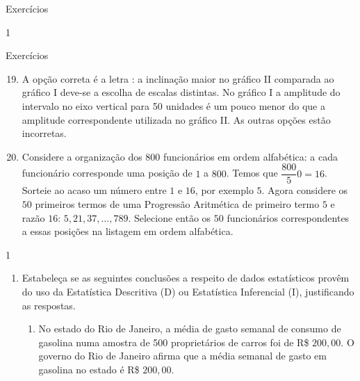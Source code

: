 {\begin{answer}{Exercícios}
{\begin{enumerate}
\begin{figure}[H]
  \end{figure}
  \end{enumerate}
}{1}
\end{answer}
\clearmargin
\begin{answer}{Exercícios}
{\exerciselist
  \begin{enumerate} \setcounter{enumi}{18}
  \item A opção correta é a letra : a inclinação maior no gráfico II comparada ao gráfico I deve-se a escolha de escalas distintas. No gráfico I a amplitude do intervalo no eixo vertical para 50 unidades é um pouco menor do que a amplitude correspondente utilizada no gráfico II. As outras opções estão incorretas.

  \item Considere a organização dos $800$ funcionários em ordem alfabética: a cada funcionário corresponde uma posição de $1$ a $800$. Temos que $\dfrac{800}50=16$. Sorteie ao acaso um número entre $1$ e $16$, por exemplo $5$. Agora considere os $50$ primeiros termos de uma Progressão Aritmética de primeiro termo $5$ e razão $16$: $5, 21, 37,..., 789$. Selecione então os $50$ funcionários correspondentes a essas posições na listagem em ordem alfabética.
  \end{enumerate}
}{1}
\end{answer}


\label{\detokenize{PE103-E:exercicios}}\label{\detokenize{PE103-E::doc}}
\begin{enumerate}
\item Estabeleça se as seguintes conclusões a respeito de dados estatísticos provêm do uso da Estatística Descritiva (D) ou Estatística Inferencial (I), justificando as respostas.
\begin{enumerate}
\item {} 
No estado do Rio de Janeiro, a média de gasto semanal de consumo de gasolina numa amostra de 500 proprietários de carros foi de R\$ $200{,}00$. O governo do Rio de Janeiro afirma que a média semanal de gasto em gasolina no estado é R\$ $200{,}00$.


\end{enumerate}
\end{enumerate}}
